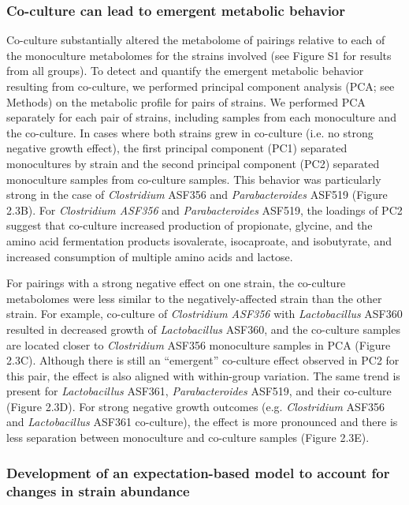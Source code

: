 \documentclass[11pt,twocolumn,notitlepage,openany,twoside]{book}
\begin{document}
\begin{refsection}
\subsubsection{Co-culture can lead to emergent metabolic behavior}

Co-culture substantially altered the metabolome of pairings relative to each of the monoculture metabolomes for the strains involved (see Figure S1 for results from all groups). To detect and quantify the emergent metabolic behavior resulting from co-culture, we performed principal component analysis (PCA; see Methods) on the metabolic profile for pairs of strains. We performed PCA separately for each pair of strains, including samples from each monoculture and the co-culture. In cases where both strains grew in co-culture (i.e. no strong negative growth effect), the first principal component (PC1) separated monocultures by strain and the second principal component (PC2) separated monoculture samples from co-culture samples. This behavior was particularly strong in the case of \textit{Clostridium} ASF356 and \textit{Parabacteroides} ASF519 (Figure 2.3B). For \textit{Clostridium ASF356} and \textit{Parabacteroides} ASF519, the loadings of PC2 suggest that co-culture increased production of propionate, glycine, and the amino acid fermentation products isovalerate, isocaproate, and isobutyrate, and increased consumption of multiple amino acids and lactose.

For pairings with a strong negative effect on one strain, the co-culture metabolomes were less similar to the negatively-affected strain than the other strain. For example, co-culture of \textit{Clostridium ASF356} with \textit{Lactobacillus} ASF360 resulted in decreased growth of \textit{Lactobacillus} ASF360, and the co-culture samples are located closer to \textit{Clostridium} ASF356 monoculture samples in PCA (Figure 2.3C). Although there is still an “emergent” co-culture effect observed in PC2 for this pair, the effect is also aligned with within-group variation. The same trend is present for \textit{Lactobacillus} ASF361, \textit{Parabacteroides} ASF519, and their co-culture (Figure 2.3D). For strong negative growth outcomes (e.g. \textit{Clostridium} ASF356 and \textit{Lactobacillus} ASF361 co-culture), the effect is more pronounced and there is less separation between monoculture and co-culture samples (Figure 2.3E).

\subsubsection{Development of an expectation-based model to account for changes in strain abundance}


\end{refsection}
\end{document}
